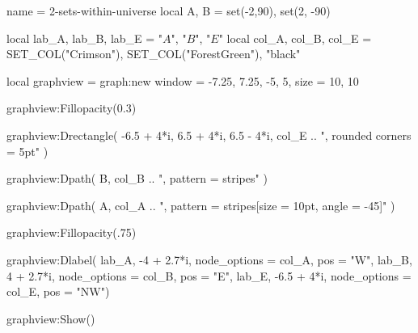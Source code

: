 \documentclass{standalone}
\begin{document}
\begin{luadraw}{name = 2-sets-within-universe}
  local A, B = set(-2,90), set(2, -90)

  local lab_A, lab_B, lab_E = "$A$", "$B$", "$E$"
  local col_A, col_B, col_E = SET_COL("Crimson"), SET_COL("ForestGreen"), "black"

  local graphview = graph:new{
    window = {-7.25, 7.25, -5, 5},
    size   = {10, 10}
  }

  graphview:Fillopacity(0.3)

  graphview:Drectangle(
    -6.5 + 4*i, 6.5 + 4*i, 6.5 - 4*i,
    col_E .. ", rounded corners = 5pt"
  )

  graphview:Dpath(
    B,
    col_B .. ", pattern = stripes"
  )

  graphview:Dpath(
    A,
    col_A .. ", pattern = {stripes[size = 10pt, angle = -45]}"
  )

  graphview:Fillopacity(.75)

  graphview:Dlabel(
    lab_A, -4   + 2.7*i, {node_options = col_A, pos = "W"},
    lab_B,  4   + 2.7*i, {node_options = col_B, pos = "E"},
    lab_E, -6.5 +   4*i, {node_options = col_E, pos = "NW"})

  graphview:Show()
\end{luadraw}
\end{document}
